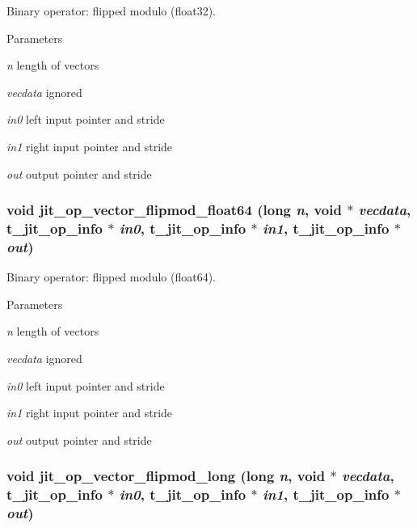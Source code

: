 Binary operator: flipped modulo (float32). 
\begin{DoxyParams}{Parameters}
\item[{\em n}]length of vectors \item[{\em vecdata}]ignored \item[{\em in0}]left input pointer and stride \item[{\em in1}]right input pointer and stride \item[{\em out}]output pointer and stride \end{DoxyParams}
\hypertarget{group__opvecmod_gaf0793db1538d53120069e25d592c0513}{
\subsubsection[{jit\_\-op\_\-vector\_\-flipmod\_\-float64}]{\setlength{\rightskip}{0pt plus 5cm}void jit\_\-op\_\-vector\_\-flipmod\_\-float64 (long {\em n}, \/  void $\ast$ {\em vecdata}, \/  {\bf t\_\-jit\_\-op\_\-info} $\ast$ {\em in0}, \/  {\bf t\_\-jit\_\-op\_\-info} $\ast$ {\em in1}, \/  {\bf t\_\-jit\_\-op\_\-info} $\ast$ {\em out})}}
\label{group__opvecmod_gaf0793db1538d53120069e25d592c0513}


Binary operator: flipped modulo (float64). 
\begin{DoxyParams}{Parameters}
\item[{\em n}]length of vectors \item[{\em vecdata}]ignored \item[{\em in0}]left input pointer and stride \item[{\em in1}]right input pointer and stride \item[{\em out}]output pointer and stride \end{DoxyParams}
\hypertarget{group__opvecmod_ga3777baffdb18d40fb2d5b6c0af754459}{
\subsubsection[{jit\_\-op\_\-vector\_\-flipmod\_\-long}]{\setlength{\rightskip}{0pt plus 5cm}void jit\_\-op\_\-vector\_\-flipmod\_\-long (long {\em n}, \/  void $\ast$ {\em vecdata}, \/  {\bf t\_\-jit\_\-op\_\-info} $\ast$ {\em in0}, \/  {\bf t\_\-jit\_\-op\_\-info} $\ast$ {\em in1}, \/  {\bf t\_\-jit\_\-op\_\-info} $\ast$ {\em out})}}
\label{group__opvecmod_ga3777baffdb18d40fb2d5b6c0af754459}


